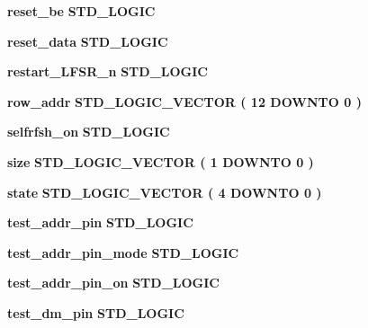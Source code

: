 \begin{DoxyCompactItemize}
{\bf reset\+\_\+be} {\bfseries \textcolor{comment}{S\+T\+D\+\_\+\+L\+O\+G\+IC}\textcolor{vhdlchar}{ }} 
\item 
{\bf reset\+\_\+data} {\bfseries \textcolor{comment}{S\+T\+D\+\_\+\+L\+O\+G\+IC}\textcolor{vhdlchar}{ }} 
\item 
{\bf restart\+\_\+\+L\+F\+S\+R\+\_\+n} {\bfseries \textcolor{comment}{S\+T\+D\+\_\+\+L\+O\+G\+IC}\textcolor{vhdlchar}{ }} 
\item 
{\bf row\+\_\+addr} {\bfseries \textcolor{comment}{S\+T\+D\+\_\+\+L\+O\+G\+I\+C\+\_\+\+V\+E\+C\+T\+OR}\textcolor{vhdlchar}{ }\textcolor{vhdlchar}{(}\textcolor{vhdlchar}{ }\textcolor{vhdlchar}{ } \textcolor{vhdldigit}{12} \textcolor{vhdlchar}{ }\textcolor{keywordflow}{D\+O\+W\+N\+TO}\textcolor{vhdlchar}{ }\textcolor{vhdlchar}{ } \textcolor{vhdldigit}{0} \textcolor{vhdlchar}{ }\textcolor{vhdlchar}{)}\textcolor{vhdlchar}{ }} 
\item 
{\bf selfrfsh\+\_\+on} {\bfseries \textcolor{comment}{S\+T\+D\+\_\+\+L\+O\+G\+IC}\textcolor{vhdlchar}{ }} 
\item 
{\bf size} {\bfseries \textcolor{comment}{S\+T\+D\+\_\+\+L\+O\+G\+I\+C\+\_\+\+V\+E\+C\+T\+OR}\textcolor{vhdlchar}{ }\textcolor{vhdlchar}{(}\textcolor{vhdlchar}{ }\textcolor{vhdlchar}{ } \textcolor{vhdldigit}{1} \textcolor{vhdlchar}{ }\textcolor{keywordflow}{D\+O\+W\+N\+TO}\textcolor{vhdlchar}{ }\textcolor{vhdlchar}{ } \textcolor{vhdldigit}{0} \textcolor{vhdlchar}{ }\textcolor{vhdlchar}{)}\textcolor{vhdlchar}{ }} 
\item 
{\bf state} {\bfseries \textcolor{comment}{S\+T\+D\+\_\+\+L\+O\+G\+I\+C\+\_\+\+V\+E\+C\+T\+OR}\textcolor{vhdlchar}{ }\textcolor{vhdlchar}{(}\textcolor{vhdlchar}{ }\textcolor{vhdlchar}{ } \textcolor{vhdldigit}{4} \textcolor{vhdlchar}{ }\textcolor{keywordflow}{D\+O\+W\+N\+TO}\textcolor{vhdlchar}{ }\textcolor{vhdlchar}{ } \textcolor{vhdldigit}{0} \textcolor{vhdlchar}{ }\textcolor{vhdlchar}{)}\textcolor{vhdlchar}{ }} 
\item 
{\bf test\+\_\+addr\+\_\+pin} {\bfseries \textcolor{comment}{S\+T\+D\+\_\+\+L\+O\+G\+IC}\textcolor{vhdlchar}{ }} 
\item 
{\bf test\+\_\+addr\+\_\+pin\+\_\+mode} {\bfseries \textcolor{comment}{S\+T\+D\+\_\+\+L\+O\+G\+IC}\textcolor{vhdlchar}{ }} 
\item 
{\bf test\+\_\+addr\+\_\+pin\+\_\+on} {\bfseries \textcolor{comment}{S\+T\+D\+\_\+\+L\+O\+G\+IC}\textcolor{vhdlchar}{ }} 
\item 
{\bf test\+\_\+dm\+\_\+pin} {\bfseries \textcolor{comment}{S\+T\+D\+\_\+\+L\+O\+G\+IC}\textcolor{vhdlchar}{ }} 

\end{DoxyCompactItemize}
